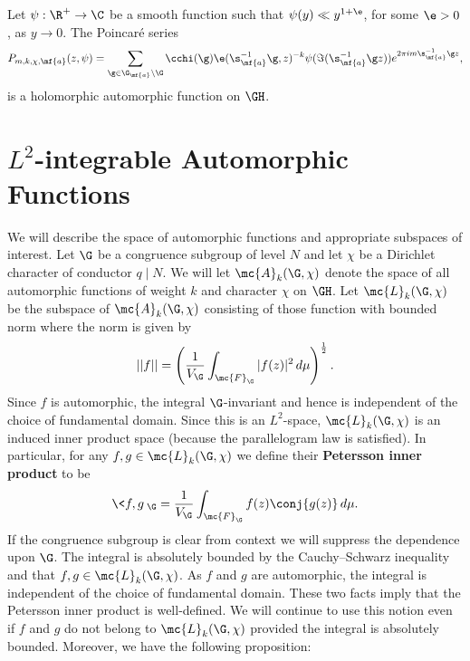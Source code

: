    \begin{theorem}
      Let $\psi:\R^{+} \to \C$ be a smooth function such that $\psi(y) \ll y^{1+\e}$, for some $\e > 0$, as $y \to 0$. The Poincar\'e series
      \[
        P_{m,k,\chi,\mf{a}}(z,\psi) = \sum_{\g \in \G_{\mf{a}}\backslash\G}\cchi(\g)\e(\s_{\mf{a}}^{-1}\g,z)^{-k}\psi(\Im(\s_{\mf{a}}^{-1}\g z))e^{2\pi im\s_{\mf{a}}^{-1}\g z},
      \]
      is a holomorphic automorphic function on $\GH$.
    \end{theorem}
  \section{\texorpdfstring{$L^{2}$}{L{2}}-integrable Automorphic Functions}
    We will describe the space of automorphic functions and appropriate subspaces of interest. Let $\G$ be a congruence subgroup of level $N$ and let $\chi$ be a Dirichlet character of conductor $q \mid N$. We will let $\mc{A}_{k}(\G,\chi)$ denote the space of all automorphic functions of weight $k$ and character $\chi$ on $\GH$. Let $\mc{L}_{k}(\G,\chi)$ be the subspace of $\mc{A}_{k}(\G,\chi)$ consisting of those function with bounded norm where the norm is given by
    \[
      ||f|| = \left(\frac{1}{V_{\G}}\int_{\mc{F}_{\G}}|f(z)|^{2}\,d\mu\right)^{\frac{1}{2}}.
    \]
    Since $f$ is automorphic, the integral $\G$-invariant and hence is independent of the choice of fundamental domain. Since this is an $L^{2}$-space, $\mc{L}_{k}(\G,\chi)$ is an induced inner product space (because the parallelogram law is satisfied). In particular, for any $f,g \in \mc{L}_{k}(\G,\chi)$ we define their \textbf{Petersson inner product} to be
    \[
      \<f,g\>_{\G} = \frac{1}{V_{\G}}\int_{\mc{F}_{\G}}f(z)\conj{g(z)}\,d\mu.
    \]
    If the congruence subgroup is clear from context we will suppress the dependence upon $\G$. The integral is absolutely bounded by the Cauchy–Schwarz inequality and that $f,g \in \mc{L}_{k}(\G,\chi)$. As $f$ and $g$ are automorphic, the integral is independent of the choice of fundamental domain. These two facts imply that the Petersson inner product is well-defined. We will continue to use this notion even if $f$ and $g$ do not belong to $\mc{L}_{k}(\G,\chi)$ provided the integral is absolutely bounded. Moreover, we have the following proposition:

